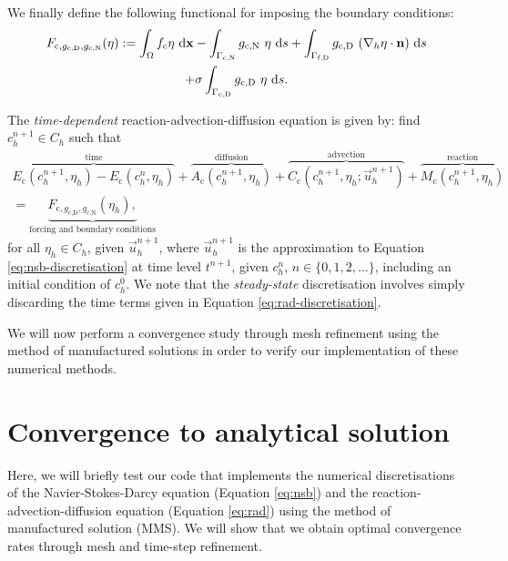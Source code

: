            We finally define the following functional for imposing the boundary conditions:
            \begin{multline}
                F_{\text{c},g_\text{c,D}, g_\text{c,N}}(\eta) := \int_\Omega f_\text{c} \eta ~\mathrm{d}\boldsymbol{\mathbf{x}} - \int_{\Gamma_\text{c,N}} g_\text{c,N} ~ \eta ~\mathrm{d} s + \int_{\Gamma_\text{f,D}} g_\text{c,D} ~ (\nabla_h \eta \cdot \boldsymbol{\mathbf{n}}) ~\mathrm{d} s \\ + \sigma\int_{\Gamma_\text{c,D}} g_\text{c,D} ~ \eta ~\mathrm{d} s.
            \end{multline}           
            
            The \textit{time-dependent} reaction-advection-diffusion equation is given by: find $c^{n+1}_h \in C_h$ such that
            \begin{multline}
                \overbrace{E_\text{c}(c^{n+1}_h, \eta_h) - E_\text{c}(c^n_h, \eta_h)}^{\text{time}} + \overbrace{A_\text{c}(c^{n+1}_h, \eta_h)}^{\text{diffusion}} + \overbrace{C_\text{c}(c^{n+1}_h, \eta_h; \vec{u}^{n+1}_h)}^{\text{advection}} + \overbrace{M_\text{c}(c^{n+1}_h, \eta_h)}^{\text{reaction}} \\ = \underbrace{F_{\text{c},g_\text{c,D},g_\text{c,N}}(\eta_h),}_{\text{forcing and boundary conditions}}
                \label{eq:rad-discretisation}
            \end{multline}
            for all $\eta_h \in C_h$, given $\vec{u}^{n+1}_h$, where $\vec{u}^{n+1}_h$ is the approximation to Equation \eqref{eq:nsb-discretisation} at time level $t^{n+1}$, given $c^n_h$, $n \in \{0, 1, 2, ...\}$, including an initial condition of $c^0_h$. We note that the \textit{steady-state} discretisation involves simply discarding the time terms given in Equation \eqref{eq:rad-discretisation}.

            We will now perform a convergence study through mesh refinement using the method of manufactured solutions in order to verify our implementation of these numerical methods.

    \section{Convergence to analytical solution} \label{sec:numerical-methods:convergence}
        Here, we will briefly test our code that implements the numerical discretisations of the Navier-Stokes-Darcy equation (Equation \eqref{eq:nsb}) and the reaction-advection-diffusion equation (Equation \eqref{eq:rad}) using the method of manufactured solution (MMS). We will show that we obtain optimal convergence rates through mesh and time-step refinement.

